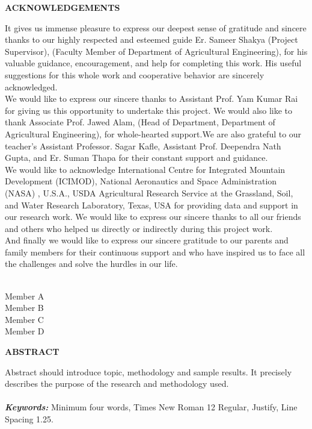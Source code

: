 \documentclass[a4paper, 12pt ]{report}
\begin{document}
	
	\newpage
	\begin{center}\fontsize{18}{0} \textbf{ACKNOWLEDGEMENTS}\end{center}
	{ It gives us immense pleasure to express our deepest sense of gratitude and sincere thanks to our highly respected and esteemed guide Er. Sameer Shakya (Project Supervisor), (Faculty Member of Department of Agricultural Engineering), for his valuable guidance, encouragement, and help for completing this work. His useful suggestions for this whole work and cooperative behavior are sincerely acknowledged.
	\\
	We would like to express our sincere thanks to Assistant Prof. Yam Kumar Rai for giving us this opportunity to undertake this project. We would also like to thank Associate Prof. Jawed Alam, (Head of Department, Department of Agricultural Engineering), for whole-hearted support.We are also grateful to our teacher's Assistant Professor. Sagar Kafle, Assistant Prof. Deependra Nath Gupta, and Er. Suman Thapa for their constant support and guidance.
	\\
	We would like to acknowledge International Centre for Integrated Mountain Development (ICIMOD), National Aeronautics and Space Administration (NASA) , U.S.A., USDA Agricultural Research Service at the Grassland, Soil, and Water Research Laboratory, Texas, USA for providing data and support in our research work. We would like to express our sincere thanks to all our friends and others who helped us directly or indirectly during this project work.
	\\
	And finally we would like to express our sincere gratitude to our parents and family members for their continuous support and who have inspired us to face all the challenges and solve the hurdles in our life.}
	\\
	\\
	\begin{flushright} {
	Member A \\
	Member B\\
	Member C \\
	Member D \\ }
	\end{flushright}
	
	
	\newpage
	\begin{center}\fontsize{18}{0} \textbf{ABSTRACT}\end{center}
	Abstract should introduce topic, methodology and sample results. It precisely describes the purpose of the research and methodology used.\\\\
		{\bf \textit{Keywords:}}
		Minimum four words, Times New Roman 12 Regular, Justify, Line Spacing 1.25.
	
\end{document}
